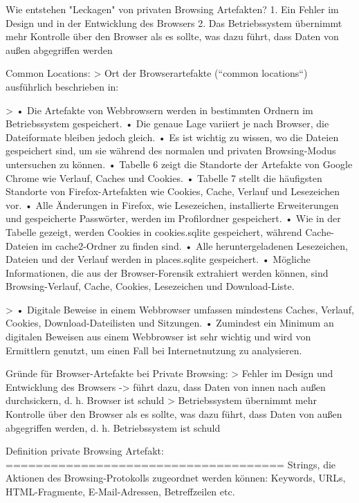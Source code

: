 Wie entstehen "Leckagen" von privaten Browsing Artefakten? \cite{Horsman.2019}
	1.  Ein Fehler im Design und in der Entwicklung des Browsers 
	2. Das Betriebssystem übernimmt mehr Kontrolle über den Browser als es sollte, was dazu führt, dass Daten von außen abgegriffen werden
	



Common Locations: 
	> Ort der Browserartefakte (“common locations“) ausführlich beschrieben in: \cite{Fayyad.2021}

	> \cite{Izzati.2022}
		•	Die Artefakte von Webbrowsern werden in bestimmten Ordnern im Betriebssystem gespeichert.
		•	Die genaue Lage variiert je nach Browser, die Dateiformate bleiben jedoch gleich.
		•	Es ist wichtig zu wissen, wo die Dateien gespeichert sind, um sie während des normalen und privaten Browsing-Modus untersuchen zu können.
		•	Tabelle 6 zeigt die Standorte der Artefakte von Google Chrome wie Verlauf, Caches und Cookies.
		•	Tabelle 7 stellt die häufigsten Standorte von Firefox-Artefakten wie Cookies, Cache, Verlauf und Lesezeichen vor.
		•	Alle Änderungen in Firefox, wie Lesezeichen, installierte Erweiterungen und gespeicherte Passwörter, werden im Profilordner gespeichert.
		•	Wie in der Tabelle gezeigt, werden Cookies in cookies.sqlite gespeichert, während Cache-Dateien im cache2-Ordner zu finden sind.
		•	Alle heruntergeladenen Lesezeichen, Dateien und der Verlauf werden in places.sqlite gespeichert.
		•	Mögliche Informationen, die aus der Browser-Forensik extrahiert werden können, sind Browsing-Verlauf, Cache, Cookies, Lesezeichen und Download-Liste.
		
	> \cite{Rochmadi.2017}
		•	Digitale Beweise in einem Webbrowser umfassen mindestens Caches, Verlauf, Cookies, Download-Dateilisten und Sitzungen.
		•	Zumindest ein Minimum an digitalen Beweisen aus einem Webbrowser ist sehr wichtig und wird von Ermittlern genutzt, um einen Fall bei Internetnutzung zu analysieren.
		
Gründe für Browser-Artefakte bei Private Browsing: \cite{Horsman.2019}
	> Fehler im Design und Entwicklung des Browsers -> führt dazu, dass Daten von innen nach außen durchsickern, d. h. Browser ist schuld 
	> Betriebssystem übernimmt mehr Kontrolle über den Browser als es sollte, was dazu führt, dass Daten von außen abgegriffen werden, d. h. Betriebssystem ist schuld


Definition private Browsing Artefakt:
=====================================
Strings, die Aktionen des Browsing-Protokolls zugeordnet werden können: Keywords, URLs, HTML-Fragmente, E-Mail-Adressen, Betreffzeilen etc.


